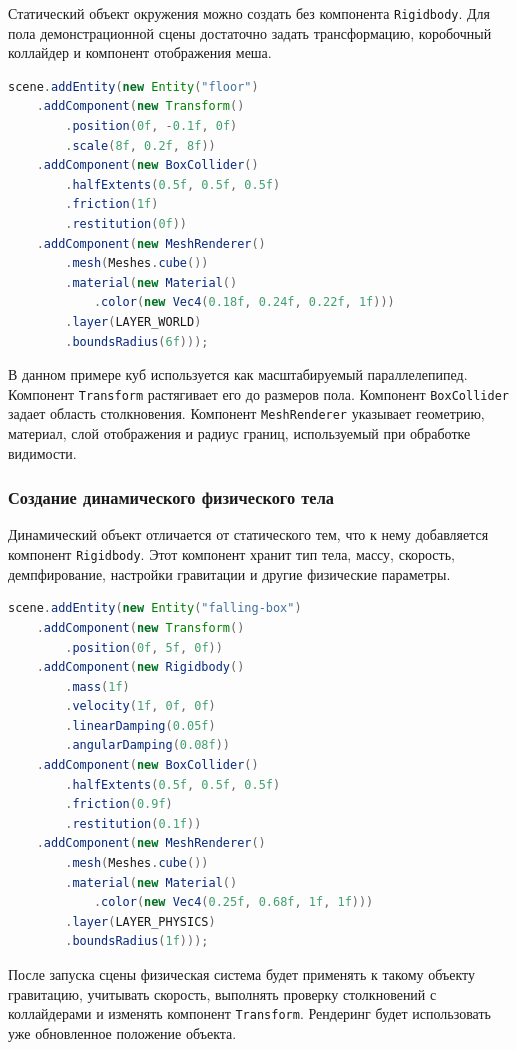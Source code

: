 Статический объект окружения можно создать без компонента \texttt{Rigidbody}. Для пола демонстрационной сцены достаточно задать трансформацию, коробочный коллайдер и компонент отображения меша.

\begin{lstlisting}[language=Java,caption={Создание пола сцены}]
scene.addEntity(new Entity("floor")
    .addComponent(new Transform()
        .position(0f, -0.1f, 0f)
        .scale(8f, 0.2f, 8f))
    .addComponent(new BoxCollider()
        .halfExtents(0.5f, 0.5f, 0.5f)
        .friction(1f)
        .restitution(0f))
    .addComponent(new MeshRenderer()
        .mesh(Meshes.cube())
        .material(new Material()
            .color(new Vec4(0.18f, 0.24f, 0.22f, 1f)))
        .layer(LAYER_WORLD)
        .boundsRadius(6f)));
\end{lstlisting}

В данном примере куб используется как масштабируемый параллелепипед. Компонент \texttt{Transform} растягивает его до размеров пола. Компонент \texttt{BoxCollider} задает область столкновения. Компонент \texttt{MeshRenderer} указывает геометрию, материал, слой отображения и радиус границ, используемый при обработке видимости.

\subsubsection{Создание динамического физического тела}

Динамический объект отличается от статического тем, что к нему добавляется компонент \texttt{Rigidbody}. Этот компонент хранит тип тела, массу, скорость, демпфирование, настройки гравитации и другие физические параметры.

\begin{lstlisting}[language=Java,caption={Создание динамического куба}]
scene.addEntity(new Entity("falling-box")
    .addComponent(new Transform()
        .position(0f, 5f, 0f))
    .addComponent(new Rigidbody()
        .mass(1f)
        .velocity(1f, 0f, 0f)
        .linearDamping(0.05f)
        .angularDamping(0.08f))
    .addComponent(new BoxCollider()
        .halfExtents(0.5f, 0.5f, 0.5f)
        .friction(0.9f)
        .restitution(0.1f))
    .addComponent(new MeshRenderer()
        .mesh(Meshes.cube())
        .material(new Material()
            .color(new Vec4(0.25f, 0.68f, 1f, 1f)))
        .layer(LAYER_PHYSICS)
        .boundsRadius(1f)));
\end{lstlisting}

После запуска сцены физическая система будет применять к такому объекту гравитацию, учитывать скорость, выполнять проверку столкновений с коллайдерами и изменять компонент \texttt{Transform}. Рендеринг будет использовать уже обновленное положение объекта.

